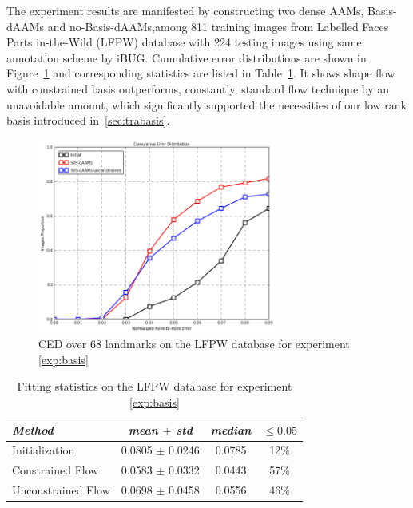 The experiment results are manifested by constructing two dense AAMs, Basis-dAAMs and no-Basis-dAAMs,among 811 training images from Labelled Faces Parts in-the-Wild (LFPW)\cite{Belhumeur2011} database with 224 testing images using same annotation scheme by iBUG. 
Cumulative error distributions are shown in Figure~\ref{fig:basis_ced} and corresponding statistics are listed in Table~\ref{tab:basis_stats}. 
It shows shape flow with constrained basis outperforms, constantly, standard flow technique by an unavoidable amount, which significantly supported the necessities of our low rank basis introduced in~\ref{sec:trabasis}.

\begin{figure}[h]
\centering
\includegraphics[width=0.7\textwidth]{resources/basis_ced}
\caption{CED over 68 landmarks on the LFPW database for experiment \ref{exp:basis}}
\label{fig:basis_ced}
\end{figure}

\begin{table}[h]
\small
\centering
\begin{tabular}{|l|c|c|c|}
\hline
\emph{Method}       & \emph{mean $\pm$ std} & \emph{median} & $\leq 0.05$\\
\hline\hline
Initialization      & 0.0805 $\pm$ 0.0246 & 0.0785 & 12\%\\
Constrained Flow    & 0.0583 $\pm$ 0.0332 & 0.0443 & 57\%\\
Unconstrained Flow  & 0.0698 $\pm$ 0.0458 & 0.0556 & 46\%\\
\hline
\end{tabular}
\caption{Fitting statistics on the LFPW database for experiment \ref{exp:basis}}
\label{tab:basis_stats}
\end{table}



